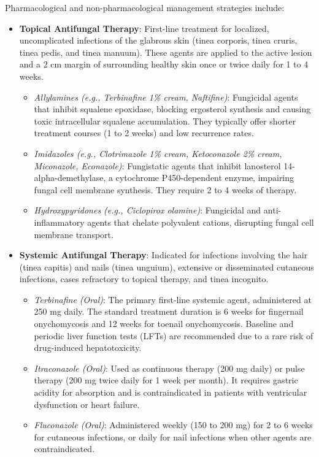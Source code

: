 Pharmacological and non-pharmacological management strategies include:
\begin{itemize}
    \item \textbf{Topical Antifungal Therapy}: First-line treatment for localized, uncomplicated infections of the glabrous skin (tinea corporis, tinea cruris, tinea pedis, and tinea manuum). These agents are applied to the active lesion and a 2 cm margin of surrounding healthy skin once or twice daily for 1 to 4 weeks.
    \begin{itemize}
        \item \textit{Allylamines (e.g., Terbinafine 1\% cream, Naftifine)}: Fungicidal agents that inhibit squalene epoxidase, blocking ergosterol synthesis and causing toxic intracellular squalene accumulation. They typically offer shorter treatment courses (1 to 2 weeks) and low recurrence rates.
        \item \textit{Imidazoles (e.g., Clotrimazole 1\% cream, Ketoconazole 2\% cream, Miconazole, Econazole)}: Fungistatic agents that inhibit lanosterol 14-alpha-demethylase, a cytochrome P450-dependent enzyme, impairing fungal cell membrane synthesis. They require 2 to 4 weeks of therapy.
        \item \textit{Hydroxypyridones (e.g., Ciclopirox olamine)}: Fungicidal and anti-inflammatory agents that chelate polyvalent cations, disrupting fungal cell membrane transport.
    \end{itemize}
    \item \textbf{Systemic Antifungal Therapy}: Indicated for infections involving the hair (tinea capitis) and nails (tinea unguium), extensive or disseminated cutaneous infections, cases refractory to topical therapy, and tinea incognito.
    \begin{itemize}
        \item \textit{Terbinafine (Oral)}: The primary first-line systemic agent, administered at 250 mg daily. The standard treatment duration is 6 weeks for fingernail onychomycosis and 12 weeks for toenail onychomycosis. Baseline and periodic liver function tests (LFTs) are recommended due to a rare risk of drug-induced hepatotoxicity.
        \item \textit{Itraconazole (Oral)}: Used as continuous therapy (200 mg daily) or pulse therapy (200 mg twice daily for 1 week per month). It requires gastric acidity for absorption and is contraindicated in patients with ventricular dysfunction or heart failure.
        \item \textit{Fluconazole (Oral)}: Administered weekly (150 to 200 mg) for 2 to 6 weeks for cutaneous infections, or daily for nail infections when other agents are contraindicated.

\end{itemize}
\end{itemize}
